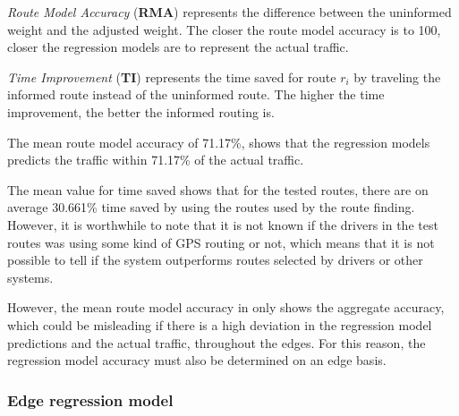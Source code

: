 \emph{Route Model Accuracy } (\textbf{RMA}) represents the difference between the uninformed weight and the adjusted weight. The closer the route model accuracy is to 100, closer the regression models are to represent the actual traffic.
 
\emph{Time Improvement} (\textbf{TI}) represents the time saved for route $r_i$ by traveling the informed route instead of the uninformed route. The higher the time improvement, the better the informed routing is.

The mean route model accuracy of 71.17\%, shows that the regression models predicts the traffic within 71.17\% of the actual traffic. 

The mean value for time saved shows that for the tested routes, there are on average 30.661\% time saved by using the routes used by the route finding. However, it is worthwhile to note that it is not known if the drivers in the test routes was using some kind of GPS routing or not, which means that it is not possible to tell if the system outperforms routes selected by drivers or other systems.

However, the mean route model accuracy in  only shows the aggregate accuracy, which could be misleading if there is a high deviation in the regression model predictions and the actual traffic, throughout the edges. For this reason, the regression model accuracy must also be determined on an edge basis.

\subsubsection{Edge regression model}